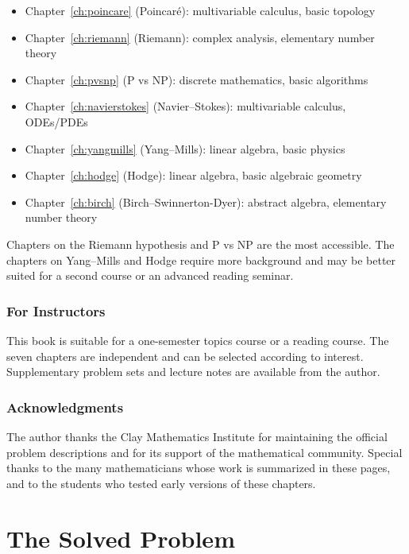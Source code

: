 \documentclass[11pt,a4paper]{book}
\theoremstyle{definition}
\begin{document}
\begin{itemize}
  \item Chapter~\ref{ch:poincare} (Poincar\'{e}): multivariable calculus, basic topology
  \item Chapter~\ref{ch:riemann} (Riemann): complex analysis, elementary number theory
  \item Chapter~\ref{ch:pvsnp} (P vs NP): discrete mathematics, basic algorithms
  \item Chapter~\ref{ch:navierstokes} (Navier--Stokes): multivariable calculus, ODEs/PDEs
  \item Chapter~\ref{ch:yangmills} (Yang--Mills): linear algebra, basic physics
  \item Chapter~\ref{ch:hodge} (Hodge): linear algebra, basic algebraic geometry
  \item Chapter~\ref{ch:birch} (Birch--Swinnerton-Dyer): abstract algebra, elementary number theory
\end{itemize}

Chapters on the Riemann hypothesis and P vs NP are the most accessible. The chapters on Yang--Mills and Hodge require more background and may be better suited for a second course or an advanced reading seminar.

\section*{For Instructors}

This book is suitable for a one-semester topics course or a reading course. The seven chapters are independent and can be selected according to interest. Supplementary problem sets and lecture notes are available from the author.

\section*{Acknowledgments}

The author thanks the Clay Mathematics Institute for maintaining the official problem descriptions and for its support of the mathematical community. Special thanks to the many mathematicians whose work is summarized in these pages, and to the students who tested early versions of these chapters.

\mainmatter

\part{The Solved Problem}
\end{document}
